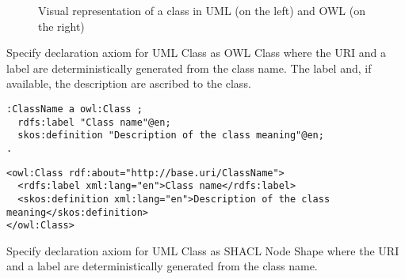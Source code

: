 \begin{figure}[!ht]
	\centering
	\begin{subfigure}{.5\textwidth}
		\centering
	\end{subfigure}%
	\begin{subfigure}{.5\textwidth}
		\centering
	\end{subfigure}
	\caption{Visual representation of a class in UML (on the left) and OWL (on the right)}
	\label{fig:class-visual}
\end{figure}

\begin{trule}
	\label{rule:class-core}
	Specify declaration axiom for UML Class as OWL Class where the URI and a label are deterministically generated from the class name. The label and, if available, the description are ascribed to the class. 
\end{trule}

\vspace{-\parskip}
\begin{minipage}[b]{.45\textwidth}
\begin{lstlisting}[language=Turtle, caption={Class declaration in Turtle syntax}, captionpos=b]
:ClassName a owl:Class ;
  rdfs:label "Class name"@en;
  skos:definition "Description of the class meaning"@en;
.
\end{lstlisting}
\end{minipage}%
\quad
\begin{minipage}[b]{.5\textwidth}
\begin{lstlisting}[language=RDF/XML, caption={Class declaration in RDF/XML syntax}, captionpos=b]
<owl:Class rdf:about="http://base.uri/ClassName">
  <rdfs:label xml:lang="en">Class name</rdfs:label>
  <skos:definition xml:lang="en">Description of the class meaning</skos:definition>  
</owl:Class>
\end{lstlisting}
\end{minipage}

\begin{trule}
	\label{rule:class-ds}
	Specify declaration axiom for UML Class as SHACL Node Shape where the URI and a label are deterministically generated from the class name.
\end{trule}

